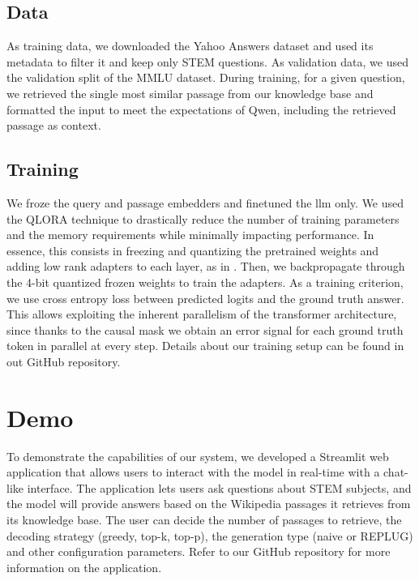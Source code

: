 \documentclass[11pt]{article}
\begin{document}
\subsection{Data}

As training data, we downloaded the Yahoo Answers dataset and used its metadata to filter it and keep only STEM questions. As validation data,
we used the validation split of the MMLU dataset. During training, for a given question, we retrieved the single most similar passage from
our knowledge base and formatted the input to meet the expectations of Qwen, including the retrieved passage as context.

\subsection{Training}

We froze the query and passage embedders and finetuned the llm only. We used the QLORA technique \cite{qlora} to drastically reduce the number of training
parameters and the memory requirements while minimally impacting performance. In essence, this consists in freezing and quantizing the pretrained weights and adding low
rank adapters to each layer, as in \cite{lora}. Then, we backpropagate through the 4-bit quantized frozen weights to train the adapters.
As a training criterion, we use cross entropy loss between predicted logits and the ground truth answer. This allows exploiting the inherent
parallelism of the transformer architecture, since thanks to the causal mask we obtain an error signal for each ground truth token in parallel at every step.
Details about our training setup can be found in out GitHub repository.

\section{Demo}

To demonstrate the capabilities of our system, we developed a Streamlit web application
that allows users to interact with the model in real-time with a chat-like interface. 
The application lets users ask questions about STEM subjects, and the model will provide answers 
based on the Wikipedia passages it retrieves from its knowledge base. 
The user can decide the number of passages to retrieve, the decoding strategy (greedy, top-k, top-p), 
the generation type (naive or REPLUG) and other configuration parameters.
Refer to our GitHub repository for more information on the application.
\end{document}

